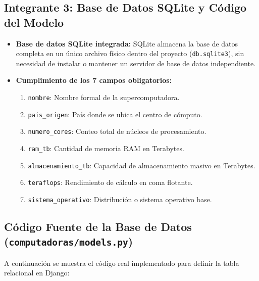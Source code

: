 \documentclass[11pt,a4paper]{article}
\begin{document}
\subsection{Integrante 3: Base de Datos SQLite y Código del Modelo}
\begin{itemize}
    \item \textbf{Base de datos SQLite integrada:} SQLite almacena la base de datos completa en un único archivo físico dentro del proyecto (\texttt{db.sqlite3}), sin necesidad de instalar o mantener un servidor de base de datos independiente.
    \item \textbf{Cumplimiento de los 7 campos obligatorios:}
    \begin{enumerate}
        \item \texttt{nombre}: Nombre formal de la supercomputadora.
        \item \texttt{pais\_origen}: País donde se ubica el centro de cómputo.
        \item \texttt{numero\_cores}: Conteo total de núcleos de procesamiento.
        \item \texttt{ram\_tb}: Cantidad de memoria RAM en Terabytes.
        \item \texttt{almacenamiento\_tb}: Capacidad de almacenamiento masivo en Terabytes.
        \item \texttt{teraflops}: Rendimiento de cálculo en coma flotante.
        \item \texttt{sistema\_operativo}: Distribución o sistema operativo base.
    \end{enumerate}
\end{itemize}

\newpage
\subsection{Código Fuente de la Base de Datos (\texttt{computadoras/models.py})}
A continuación se muestra el código real implementado para definir la tabla relacional en Django:
\end{document}
